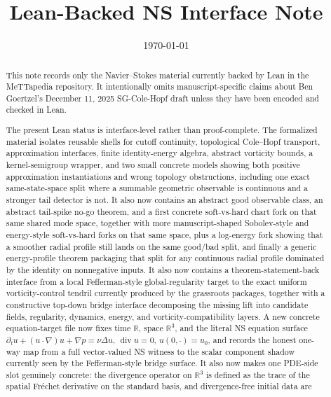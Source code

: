 \documentclass[11pt]{article}
\title{Lean-Backed NS Interface Note}
\author{}
\date{\today}
\begin{document}
\maketitle

\begin{abstract}
This note records only the Navier--Stokes material currently backed by Lean in
the MeTTapedia repository.  It intentionally omits manuscript-specific claims
about Ben Goertzel's December 11, 2025 SG-Cole-Hopf draft unless they have been
encoded and checked in Lean.

The present Lean status is interface-level rather than proof-complete.  The
formalized material isolates reusable shells for cutoff continuity, topological
Cole--Hopf transport, approximation interfaces, finite identity-energy
algebra, abstract vorticity bounds, a kernel-semigroup wrapper, and two small
concrete models showing both positive approximation instantiations and wrong
topology obstructions, including one exact same-state-space split where a
summable geometric observable is continuous and a stronger tail detector is
not.  It also now contains an abstract good observable class, an abstract
tail-spike no-go theorem, and a first concrete soft-vs-hard chart fork on that
same shared mode space, together with more manuscript-shaped Sobolev-style and
energy-style soft-vs-hard forks on that same space, plus a log-energy fork
showing that a smoother radial profile still lands on the same good/bad split,
and finally a generic energy-profile theorem packaging that split for any
continuous radial profile dominated by the identity on nonnegative inputs.  It
also now contains a theorem-statement-back interface from a local
Fefferman-style global-regularity target to the exact uniform vorticity-control
tendril currently produced by the grassroots packages, together with a
constructive top-down bridge interface decomposing the missing lift into
candidate fields, regularity, dynamics, energy, and vorticity-compatibility
layers.  A new concrete equation-target file now fixes time \(\mathbb{R}\),
space \(\mathbb{R}^3\), and the literal NS equation surface
\(\partial_t u + (u \cdot \nabla)u + \nabla p = \nu \Delta u\), \(\operatorname{div} u = 0\),
\(u(0,\cdot)=u_0\), and records the honest one-way map from a full vector-valued
NS witness to the scalar component shadow currently seen by the Fefferman-style
bridge surface.  It also now makes one PDE-side slot genuinely concrete: the
divergence operator on \(\mathbb{R}^3\) is defined as the trace of the spatial
Fr\'echet derivative on the standard basis, and divergence-free initial data are

\end{abstract}
\end{document}
